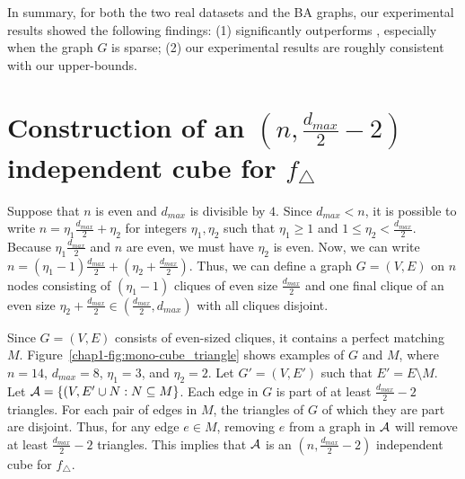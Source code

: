 In summary, for both the two real datasets and the BA graphs, our experimental results showed the following findings: 
(1)  significantly outperforms , especially when the graph $G$ is sparse; 
(2) our experimental results are roughly consistent with our upper-bounds.

\section{Construction of an $(n, \frac{d_{max}}{2}-2)$ independent cube for $f_\triangle$}
\label{chap1-sub:cube_triangle}
Suppose that $n$ is even and $d_{max}$ is divisible by $4$.
Since $d_{max} < n$, it is possible to write 
$n = \eta_1 \frac{d_{max}}{2} + \eta_2$ 
for integers 
$\eta_1, \eta_2$
such that 
$\eta_1 \geq 1$ and $1 \leq \eta_2 < \frac{d_{max}}{2}$. 
Because 
$\eta_1 \frac{d_{max}}{2}$ 
and $n$ are even, 
we must have 
$\eta_2$ 
is even.
Now, we can write 
$n = (\eta_1-1) \frac{d_{max}}{2} + (\eta_2 + \frac{d_{max}}{2})$.
Thus, 
we can define 
a graph $G=(V,E)$ on $n$ 
nodes 
consisting of 
$(\eta_1-1)$ 
cliques of 
even 
size
$\frac{d_{max}}{2}$ and one final clique of an even size $\eta_2+\frac{d_{max}}{2} \in (\frac{d_{max}}{2}, d_{max})$ 
with all cliques disjoint. 

Since $G=(V,E)$ consists of even-sized cliques, it contains a perfect matching $M$. 
Figure~\ref{chap1-fig:mono-cube_triangle} shows examples of $G$ and $M$, where $n=14$, $d_{max} = 8$, $\eta_1 = 3$, and $\eta_2 = 2$. 
Let 
$G'=(V,E')$ such that $E' = E \setminus M$. 
Let $\mathcal{A} = \{(V,E' \cup N: N \subseteq M\}$. 
Each edge in $G$ is part of at least $\frac{d_{max}}{2}-2$ triangles. 
For each pair of edges in $M$, the triangles of $G$ of which they are part
are disjoint. 
Thus, 
for any edge $e \in M$, 
removing $e$ 
from 
a graph in $\mathcal{A}$ 
will remove at least $\frac{d_{max}}{2}-2$ triangles. This implies 
that $\mathcal{A}$ 
is an $(n,\frac{d_{max}}{2}-2)$ independent cube for $f_\triangle$.

